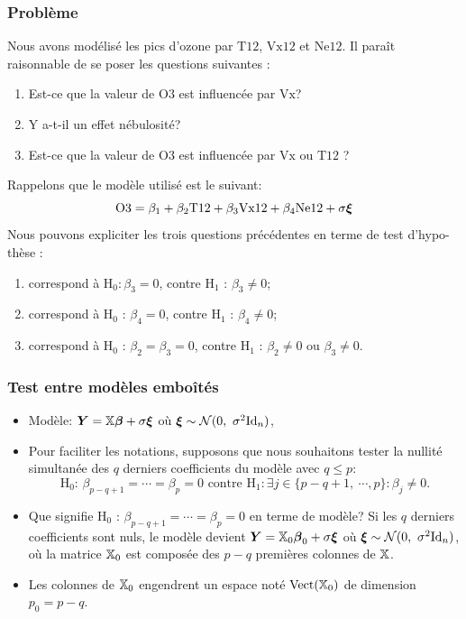 \begin{frame}
\frametitle{Problème}
Nous avons modélisé les pics d'ozone par $\mathrm{T12}$, $\mathrm{Vx12}$ et $\mathrm{Ne12}$.
Il para\^{i}t raisonnable de se poser les questions suivantes :
\begin{enumerate}
\item Est-ce que la valeur de $\mathrm{O3}$ est influenc\'{e}e par $\mathrm{Vx}$?
\item Y a-t-il un effet n\'{e}bulosit\'{e}?
\item Est-ce que la valeur de $\mathrm{O3}$ est influenc\'{e}e par $\mathrm{Vx}$ ou $\mathrm{T12}$ ?
\end{enumerate}
Rappelons que le mod\`{e}le utilis\'{e} est le suivant:
\[
\mathrm{O3}= \beta_1 + \beta_2 \mathrm{T12} + \beta_3 \mathrm{Vx12} + \beta_4 \mathrm{Ne12} + \sigma \boldsymbol{\xi}
\]
Nous pouvons expliciter les trois questions pr\'{e}c\'{e}dentes en terme de test d'hypo- th\`{e}se :
\begin{enumerate}
\item correspond \`{a} $\mathrm{H}_{0}:\beta_{3}=0$, contre $\mathrm{H}_{1}$ : $\beta_{3}\neq 0$;
\item  correspond \`{a} $\mathrm{H}_{0}$ : $\beta_{4}=0$, contre $\mathrm{H}_{1}$ : $\beta_{4}\neq 0$;
\item correspond \`{a} $\mathrm{H}_{0}$ : $\beta_{2}=\beta_{3}=0$, contre $\mathrm{H}_{1}$ : $\beta_{2}\neq 0$ ou $\beta_{3}\neq 0$.
\end{enumerate}
\end{frame}

\begin{frame}
\frametitle{Test entre mod\`{e}les embo\^{i}t\'{e}s}
\begin{itemize}
\item \alert{Modèle}:
$\operatorname{\boldsymbol{Y}}=\mathbb{X}\boldsymbol{\beta}+ \sigma \boldsymbol{\xi}$ o\`{u} $\bnoise \sim \gauss(0,\ \sigma^{2}\Id{n})$,
\item Pour faciliter les notations, supposons que nous souhaitons tester la nullit\'{e} simultan\'{e}e des $q$ derniers coefficients du mod\`{e}le avec $q\leq p$:
\[
\text{
$\mathrm{H}_{0}$: $\beta_{p-q+1}=\cdots=\beta_{p}=0$ contre $\mathrm{H}_{1}:\exists j\in\{p-q+1,\ \cdots,p\}:\beta_{j}\neq 0$.
}
\]
\item Que signifie $\mathrm{H}_{0}$ : $\beta_{p-q+1}=\cdots=\beta_{p}=0$ en terme de mod\`{e}le? Si les $q$ derniers coefficients sont nuls, le mod\`{e}le devient
$\operatorname{\boldsymbol{Y}}=\mathbb{X}_{0}\boldsymbol{\beta}_{0}+\sigma \boldsymbol{\xi}$ o\`{u} $\bnoise \sim \gauss(0,\ \sigma^{2}\Id{n})$,
o\`{u} la matrice $\mathbb{X}_{0}$ est compos\'{e}e des $p-q$ premi\`{e}res colonnes de $\mathbb{X}$.
\item Les colonnes de $\mathbb{X}_{0}$ engendrent un espace not\'{e} $\mathrm{Vect}(\mathbb{X}_0)$ de dimension $p_{0}=p-q$.
\end{itemize}
\end{frame}

